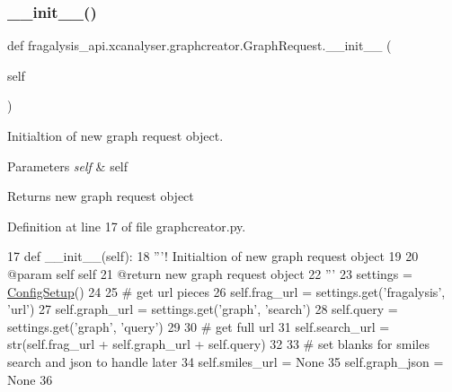 \subsubsection{\texorpdfstring{\+\_\+\+\_\+init\+\_\+\+\_\+()}{\_\_init\_\_()}}
{\footnotesize\ttfamily def fragalysis\+\_\+api.\+xcanalyser.\+graphcreator.\+Graph\+Request.\+\_\+\+\_\+init\+\_\+\+\_\+ (\begin{DoxyParamCaption}\item[{}]{self }\end{DoxyParamCaption})}



Initialtion of new graph request object. 


\begin{DoxyParams}{Parameters}
{\em self} & self \\
\hline
\end{DoxyParams}
\begin{DoxyReturn}{Returns}
new graph request object 
\end{DoxyReturn}


Definition at line 17 of file graphcreator.\+py.


\begin{DoxyCode}
17     \textcolor{keyword}{def }\_\_init\_\_(self):
18         \textcolor{stringliteral}{'''! Initialtion of new graph request object}
19 \textcolor{stringliteral}{}
20 \textcolor{stringliteral}{        @param self self}
21 \textcolor{stringliteral}{        @return new graph request object}
22 \textcolor{stringliteral}{        '''}
23         settings = \hyperlink{namespacefragalysis__api_1_1xcglobalscripts_1_1set__config_a9b5445f82604ad45c1e85e2b07e4a317}{ConfigSetup}()
24 
25         \textcolor{comment}{# get url pieces}
26         self.frag\_url = settings.get(\textcolor{stringliteral}{'fragalysis'}, \textcolor{stringliteral}{'url'})
27         self.graph\_url = settings.get(\textcolor{stringliteral}{'graph'}, \textcolor{stringliteral}{'search'})
28         self.query = settings.get(\textcolor{stringliteral}{'graph'}, \textcolor{stringliteral}{'query'})
29 
30         \textcolor{comment}{# get full url}
31         self.search\_url = str(self.frag\_url + self.graph\_url + self.query)
32 
33         \textcolor{comment}{# set blanks for smiles search and json to handle later}
34         self.smiles\_url = \textcolor{keywordtype}{None}
35         self.graph\_json = \textcolor{keywordtype}{None}
36 
\end{DoxyCode}


